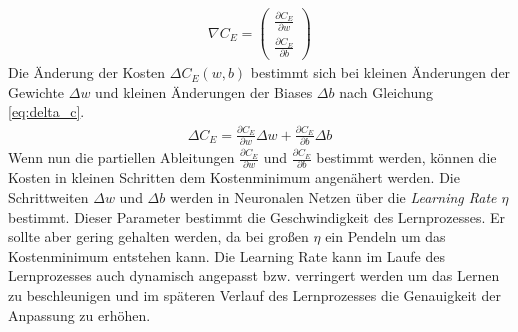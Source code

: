 \documentclass[../main.tex]{subfiles}
\begin{document}
\begin{align}
	\nabla C_E = \begin{pmatrix}
	\frac{\partial C_E}{\partial w} \\
	\frac{\partial C_E}{\partial b}
	\end{pmatrix} \label{eq:nabla_c}
\end{align} 
Die Änderung der Kosten $\Delta C_E(w,b)$ bestimmt sich bei kleinen Änderungen der Gewichte $\Delta w$ und kleinen Änderungen der Biases $\Delta b$ nach Gleichung \ref{eq:delta_c}.
\begin{align}
	\Delta C_E = \frac{\partial C_E}{\partial w}\Delta w + \frac{\partial C_E}{\partial b}\Delta b \label{eq:delta_c}
\end{align}
Wenn nun die partiellen Ableitungen $\frac{\partial C_E}{\partial w}$ und $\frac{\partial C_E}{\partial b}$ bestimmt werden, können die Kosten in kleinen Schritten dem Kostenminimum angenähert werden. Die Schrittweiten $\Delta w$ und $\Delta b$ werden in Neuronalen Netzen über die \emph{Learning Rate $\eta$} bestimmt. Dieser Parameter bestimmt die Geschwindigkeit des Lernprozesses. Er sollte aber gering gehalten werden, da bei großen $\eta$ ein Pendeln um das Kostenminimum entstehen kann. Die Learning Rate kann im Laufe des Lernprozesses auch dynamisch angepasst bzw. verringert werden um das Lernen zu beschleunigen und im späteren Verlauf des Lernprozesses die Genauigkeit der Anpassung zu erhöhen. \\
\end{document}

